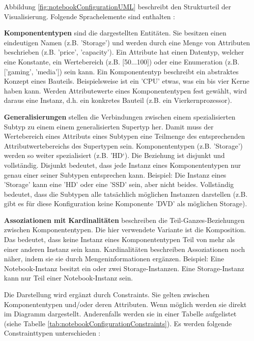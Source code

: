 \documentclass[12pt,a4paper,bibliography=totocnumbered,listof=totoc]{scrartcl}
\begin{document}
Abbildung \ref{fig:notebookConfigurationUML} beschreibt den Strukturteil der Visualisierung. Folgende Sprachelemente sind enthalten \citep{felferning14}:
\begin{compactitem}
\item \textbf{Komponententypen} sind die dargestellten Entitäten. Sie besitzen einen eindeutigen Namen (z.B. 'Storage') und werden durch eine Menge von Attributen beschrieben (z.B. 'price', 'capacity'). Ein Attribute hat einen Datentyp, welcher eine Konstante, ein Wertebereich (z.B. [50...100]) oder eine Enumeration (z.B. ['gaming', 'media']) sein kann. Ein Komponententyp beschreibt ein abstraktes Konzept eines Bauteils. Beispielsweise ist ein 'CPU' etwas, was ein bis vier Kerne haben kann. Werden Attributewerte eines Komponententypen fest gewählt, wird daraus eine Instanz, d.h. ein konkretes Bauteil (z.B. ein Vierkernprozessor).
\item \textbf{Generalisierungen} stellen die Verbindungen zwischen einem spezialisierten Subtyp zu einem einem generalisierten Supertyp her. Damit muss der Wertebereich eines Attributs eines Subtypen eine Teilmenge des entsprechenden Attributwertebereichs des Supertypen sein. Komponententypen (z.B. 'Storage') werden so weiter spezialisiert (z.B. 'HD‘). Die Beziehung ist disjunkt und vollständig. Disjunkt bedeutet, dass jede Instanz eines Komponententypen nur genau einer seiner Subtypen entsprechen kann. Beispiel: Die Instanz eines 'Storage' kann eine 'HD' oder eine 'SSD' sein, aber nicht beides. Vollständig bedeutet, dass die Subtypen alle tatsächlich möglichen Instanzen darstellen (z.B. gibt es für diese Konfiguration keine Komponente 'DVD' als möglichen Storage).
\item \textbf{Assoziationen mit Kardinalitäten} beschreiben die Teil-Ganzes-Beziehungen zwischen Komponententypen. Die hier verwendete Variante ist die Komposition. Das bedeutet, dass keine Instanz eines Komponententypen Teil von mehr als einer anderen Instanz sein kann. Kardinalitäten beschreiben Assoziationen noch näher, indem sie sie durch Mengeninformationen ergänzen. Beispiel: Eine Notebook-Instanz besitzt ein oder zwei Storage-Instanzen. Eine Storage-Instanz kann nur Teil einer Notebook-Instanz sein.
\end{compactitem}

Die Darstellung wird ergänzt durch Constraints. Sie gelten zwischen Komponententypen und/oder deren Attributen. Wenn möglich werden sie direkt im Diagramm dargestellt. Anderenfalls werden sie in einer Tabelle aufgelistet (siehe Tabelle \ref{tab:notebookConfigurationConstraints}). Es werden folgende Constrainttypen unterschieden \citep{felferning14}:
\end{document}
